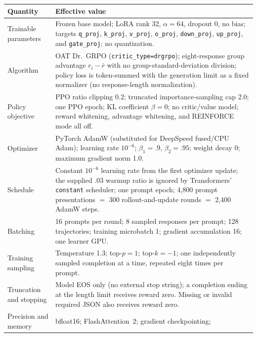 \begin{center}
\begin{minipage}{\linewidth}
\centering
{}
\label{tab:exp3-oat-common}
\scriptsize
\setlength{\tabcolsep}{3pt}
\begin{tabular}{p{.29\linewidth}p{.66\linewidth}}
\toprule
\textbf{Quantity} & \textbf{Effective value} \\
\midrule
Trainable parameters & Frozen base model; LoRA rank 32, $\alpha=64$, dropout 0,
no bias; targets \texttt{q\_proj}, \texttt{k\_proj}, \texttt{v\_proj},
\texttt{o\_proj}, \texttt{down\_proj}, \texttt{up\_proj}, and
\texttt{gate\_proj}; no quantization. \\
Algorithm & OAT Dr.~GRPO (\texttt{critic\_type=drgrpo}); eight-response group
advantage $r_i-\bar r$ with no group-standard-deviation division; policy loss is
token-summed with the generation limit as a fixed normalizer (no response-length
normalization). \\
Policy objective & PPO ratio clipping 0.2; truncated importance-sampling cap 2.0;
one PPO epoch; KL coefficient $\beta=0$; no critic/value model; reward whitening,
advantage whitening, and REINFORCE mode all off. \\
Optimizer & PyTorch AdamW \citep{loshchilov2019decoupled} (substituted for
DeepSpeed fused/CPU Adam); learning rate
$10^{-6}$; $\beta_1=.9$, $\beta_2=.95$; weight decay 0; maximum gradient norm 1.0. \\
Schedule & Constant $10^{-6}$ learning rate from the first optimizer update; the
supplied .03 warmup ratio is ignored by Transformers' \texttt{constant} scheduler;
one prompt epoch; 4,800 prompt presentations $=$ 300 rollout-and-update rounds
$=$ 2,400 AdamW steps. \\
Batching & 16 prompts per round; 8 sampled responses per prompt; 128 trajectories;
training microbatch 1; gradient accumulation 16; one learner GPU. \\
Training sampling & Temperature 1.3; top-$p=1$; top-$k=-1$; one independently
sampled completion at a time, repeated eight times per prompt. \\
Truncation and stopping & Model EOS only (no external stop string); a completion
ending at the length limit receives reward zero.  Missing or invalid required JSON
also receives reward zero. \\
Precision and memory & bfloat16; FlashAttention~2; gradient checkpointing;

\end{tabular}
\end{minipage}
\end{center}
